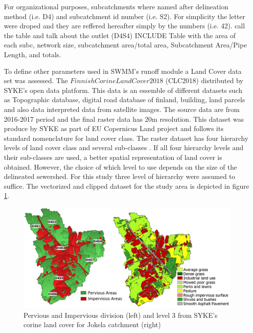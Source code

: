 For organizational purposes, subcatchments where named after delineation method (i.e. D4) and subcatchment id number (i.e. S2). For simplicity the letter were droped and they are reffered hereafter simply by the numbers (i.e. 42). 
call the table and talk about the outlet (D4S4)
INCLUDE Table with the area of each subc, network size, subcatchment area/total area, Subcatchment Area/Pipe Length, and totals.
    
To define other parameters used in SWMM's runoff module a Land Cover data set was assessed. The $Finnish Corine Land Cover 2018$ (CLC2018) distributed by SYKE's open data platform. This data is an essemble of different datasets such as Topographic database, digital road database of finland, building, land parcels and also data interpreted data from satellite images. The source data are from 2016-2017 period and the final raster data has 20m resolution. This dataset was produce by SYKE as part of EU Copernicus Land project and follows its standard nomenclature for land cover class. The raster dataset has four hierarchy levels of land cover class and several sub-classes \cite{sykedata}. If all four hierarchy levels and their sub-classes are used, a better spatial representation of land cover is obtained. However, the choice of which level to use depends on the size of the delineated sewershed. For this study three level of hierarchy were assumed to suffice. The vectorized and clipped dataset for the study area is depicted in figure \ref{fig:landcover}. 


\begin{figure}[h]
    \centering
	\includegraphics[scale=0.6]{figures/land_cover.png}
	\caption{Pervious and Impervious division (left) and level 3 from SYKE's corine land cover for Jokela catchment (right) \cite{sykedata}}
	\label{fig:landcover}
\end{figure}

